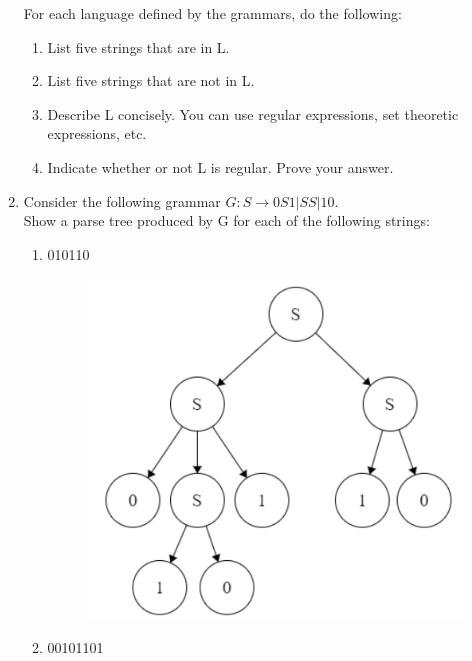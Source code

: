 \documentclass{article}
\begin{document}
\begin{enumerate}
\begin{enumerate}[label=(\alph*)]
\begin{enumerate}
		 	\end{enumerate}
		 \end{enumerate}
	For each language defined by the grammars, do the following:
		\begin{enumerate}[label=(\alph*)]
			\item  List five strings that are in L.
			\item  List five strings that are not in L.
			\item Describe L concisely. You can use regular expressions, set theoretic expressions, etc.
			\item  Indicate whether or not L is regular. Prove your answer.
		\end{enumerate}
		\item  Consider the following grammar $G : S \rightarrow 0S1|SS|10$.\\
		Show a parse tree produced by G for each of the following strings:
		\begin{enumerate}[label=(\alph*)]
			\item 010110	
			\begin{figure}[H]
				\centering
				\includegraphics[width=0.7\linewidth]{8a}
				\caption{}
				\label{fig:8a}
			\end{figure}
			\item 00101101
			\begin{figure}[H]
				\centering

\end{figure}
\end{enumerate}
\end{enumerate}
\end{document}
